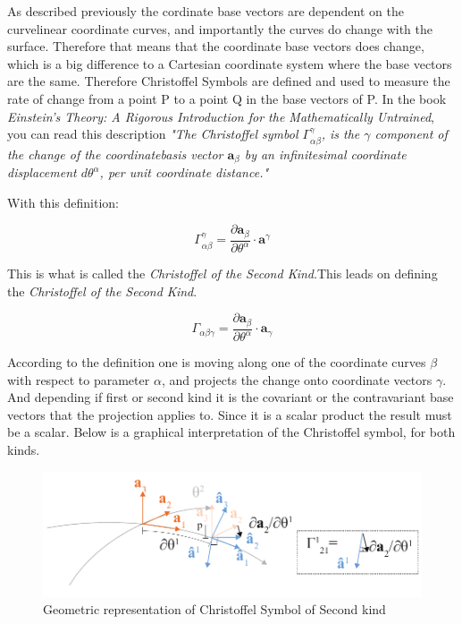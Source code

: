 As described previously the cordinate base vectors are dependent on the curvelinear coordinate curves, and importantly the curves do change with the surface. Therefore that means that the coordinate base vectors does change, which is a big difference to a Cartesian coordinate system where the base vectors are the same. Therefore Christoffel Symbols are defined and used to measure the rate of change from a point P to a point Q in the base vectors of P.
In the book  \textit{Einstein's Theory: A Rigorous Introduction for the Mathematically Untrained}, you can read this description \textit{ "The Christoffel symbol $\Gamma^\gamma_{\alpha \beta}$, is the $\gamma$ component of the change of the coordinatebasis vector $ \textbf{a}_\beta $ by an infinitesimal coordinate displacement $ d\theta^\alpha $, per unit coordinate
distance."} \cite{ref:Einstein}

With this definition:

\begin{equation}
\Gamma^\gamma_{\alpha \beta} = \frac{\partial\textbf{a}_\beta}{\partial\theta^\alpha}\cdot \textbf{a}^\gamma
\end{equation}

This is what is called the \textit{Christoffel of the Second Kind}.This leads on defining the \textit{Christoffel of the Second Kind}.

\begin{equation}
\Gamma_{\alpha \beta \gamma} = \frac{\partial\textbf{a}_\beta}{\partial\theta^\alpha}\cdot \textbf{a}_\gamma
\end{equation}

According to the definition one is moving along one of the coordinate curves $\beta$ with respect to parameter $\alpha$, and projects the change onto coordinate vectors $\gamma$. And depending if first or second kind it is the covariant or the contravariant base vectors that the projection applies to. Since it is a scalar product the result must be a scalar. Below is a graphical interpretation of the Christoffel symbol, for both kinds. 

\begin{figure}[H]
\centering
\includegraphics[width=0.9\linewidth ]{figure/Theory/christoffelSecondKind.pdf}
\caption{ Geometric representation of Christoffel Symbol of Second kind }
\end{figure}

